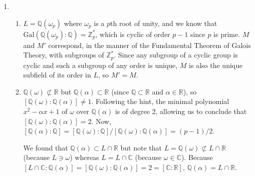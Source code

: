 \documentclass[12pt]{article}
\begin{document}
\begin{enumerate}
    \item
        \begin{enumerate}
            \item
                $L = \mathbb{Q}(\omega_p)$ where $\omega_p$ is a $p$th root of unity, and we know that $\text{Gal}(\mathbb{Q}(\omega_p) : \mathbb{Q}) = \mathbb{Z}_p^*$, which is cyclic of order $p - 1$ since $p$ is prime. $M$ and $M'$ correspond, in the manner of the Fundamental Theorem of Galois Theory, with subgroups of $\mathbb{Z}_p^*$. Since any subgroup of a cyclic group is cyclic and such a subgroup of any order is unique, $M$ is also the unique subfield of its order in $L$, so $M' = M$.

            \setcounter{enumii}{2}
            \item
                $\mathbb{Q}(\omega) \not\subset \mathbb{R}$ but $\mathbb{Q}(\alpha) \subset \mathbb{R}$ (since $\mathbb{Q} \subset \mathbb{R}$ and $\alpha \in \mathbb{R}$), so $[\mathbb{Q}(\omega) : \mathbb{Q}(\alpha)] \neq 1$. Following the hint, the minimal polynomial $x^2 - \alpha x + 1$ of $\omega$ over $\mathbb{Q}(\alpha)$ is of degree 2, allowing us to conclude that $[\mathbb{Q}(\omega) : \mathbb{Q}(\alpha)] = 2$. Now, $[\mathbb{Q}(\alpha) : \mathbb{Q}] = [\mathbb{Q}(\omega) : \mathbb{Q}] / [\mathbb{Q}(\omega) : \mathbb{Q}(\alpha)] = (p - 1) / 2$. \par
                We found that $\mathbb{Q}(\alpha) \subset L \cap \mathbb{R}$ but note that $L = \mathbb{Q}(\omega) \not\subset L \cap \mathbb{R}$ (because $L \ni \omega$) whereas $L = L \cap \mathbb{C}$ (because $\omega \in \mathbb{C}$). Because $[L \cap \mathbb{C} : \mathbb{Q}(\alpha)] = [\mathbb{Q}(\omega) : \mathbb{Q}(\alpha)] = 2 = [\mathbb{C} : \mathbb{R}]$, $\mathbb{Q}(\alpha) = L \cap \mathbb{R}$.
        \end{enumerate}
\end{enumerate}
\end{document}
